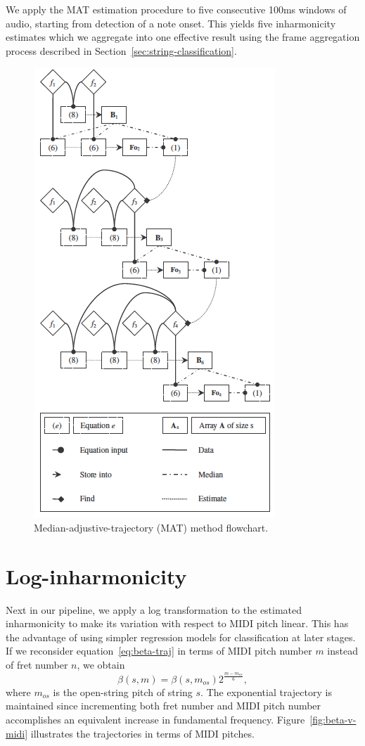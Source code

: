 \documentclass[12pt]{cmuthesis}
\begin{document}
We apply the MAT estimation procedure to five consecutive 100ms windows of audio, starting from detection of a note onset. This yields five inharmonicity estimates which we aggregate into one effective result using the frame aggregation process described in Section~\ref{sec:string-classification}.
\begin{figure}[!htbp] 
\label{fig:mat-flowchart}
\centering
\includegraphics[scale=0.9]{mat-flowchart}
\caption{Median-adjustive-trajectory (MAT) method flowchart.}
\end{figure}

\section{Log-inharmonicity}
Next in our pipeline, we apply a log transformation to the estimated inharmonicity to make its variation with respect to MIDI pitch linear. This has the advantage of using simpler regression models for classification at later stages. If we reconsider equation~\eqref{eq:beta-traj} in terms of MIDI pitch number $m$ instead of fret number $n$, we obtain
\begin{equation}
\beta(s,m) = \beta(s,m_{os})2^{\frac{m-m_{os}}{6}},
\end{equation}
where $m_{os}$ is the open-string pitch of string $s$. The exponential trajectory is maintained since incrementing both fret number and MIDI pitch number accomplishes an equivalent increase in fundamental frequency. Figure~\ref{fig:beta-v-midi} illustrates the trajectories in terms of MIDI pitches.
\end{document}
